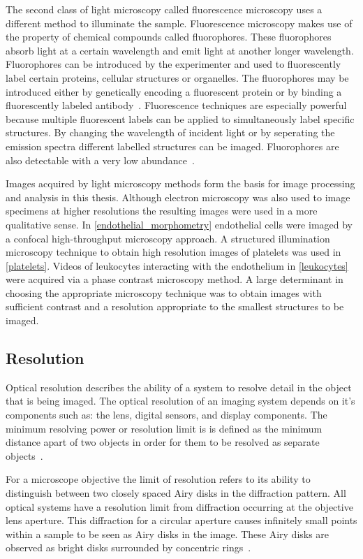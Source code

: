 The second class of light microscopy called fluorescence microscopy uses a different method to illuminate the sample. Fluorescence microscopy makes use of the property of chemical compounds called fluorophores. These fluorophores absorb light at a certain wavelength and emit light at another longer wavelength. Fluorophores can be introduced by the experimenter and used to fluorescently label certain proteins, cellular structures or organelles. The fluorophores may be introduced either by genetically encoding a fluorescent protein or by binding a fluorescently labeled antibody~\cite{Thorn2016}. Fluorescence techniques are especially powerful because multiple fluorescent labels can be applied to simultaneously label specific structures. By changing the wavelength of incident light or by seperating the emission spectra different labelled structures can be imaged. Fluorophores are also detectable with a very low abundance~\cite{Ljosa2009}.

Images acquired by light microscopy methods form the basis for image processing and analysis in this thesis. Although electron microscopy was also used to image specimens at higher resolutions the resulting images were used in a more qualitative sense. In \autoref{endothelial_morphometry} endothelial cells were imaged by a confocal high-throughput microscopy approach. A structured illumination microscopy technique to obtain high resolution images of platelets was used in \autoref{platelets}. Videos of leukocytes interacting with the endothelium in \autoref{leukocytes} were acquired via a phase contrast microscopy method. A large determinant in choosing the appropriate microscopy technique was to obtain images with sufficient contrast and a resolution appropriate to the smallest structures to be imaged.

\subsection{Resolution}
\label{introduction:microscopy:resolution}
Optical resolution describes the ability of a system to resolve detail in the object that is being imaged. The optical resolution of an imaging system depends on it's components such as: the lens, digital sensors, and display components. The minimum resolving power or resolution limit is is defined as the minimum distance apart of two objects in order for them to be resolved as separate objects~\cite{Abbe1873}. 

For a microscope objective the limit of resolution refers to its ability to distinguish between two closely spaced Airy disks in the diffraction pattern. All optical systems have a resolution limit from diffraction occurring at the objective lens aperture. This diffraction for a circular aperture causes infinitely small points within a sample to be seen as Airy disks in the image. These Airy disks are observed as bright disks surrounded by concentric rings~\cite{Spector2006}.

